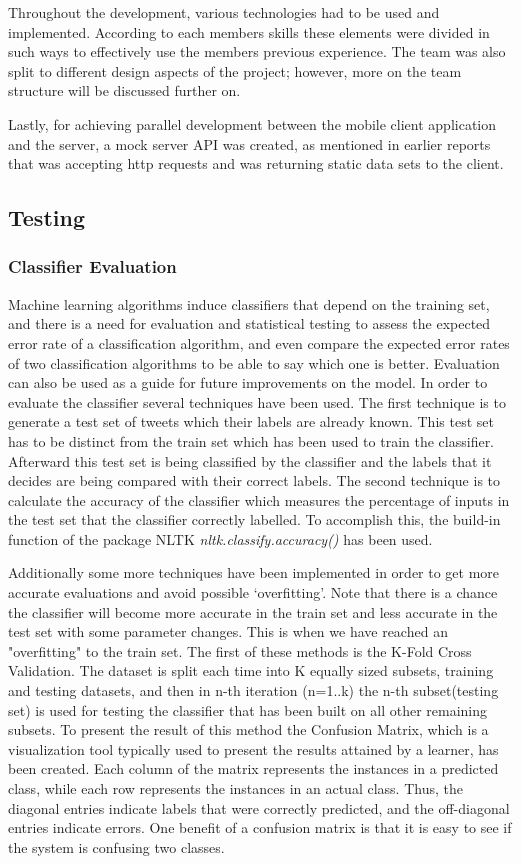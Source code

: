 Throughout the development, various technologies had to be used and implemented. According to each 
members skills these elements were divided in such ways to effectively use the members previous 
experience. The team was also split to different design aspects of the project; however, more on the 
team structure will be discussed further on.

Lastly, for achieving parallel development between 
the mobile client application and the server, a mock server API was created, as mentioned in earlier 
reports that was accepting http requests and was returning static data sets to the client. 

\subsection{Testing} 
\subsubsection{Classifier Evaluation} 
Machine learning algorithms induce classifiers that depend on the training set, and there is a need for evaluation and statistical testing to assess the expected error rate of a classification algorithm, and even compare the expected error rates of two classification algorithms to be able to say which one is better. Evaluation can also be used as a guide for future improvements on the model. In order to evaluate the classifier several techniques have been used. The first technique is to generate a test set of tweets which their labels are already known. This test set has to be distinct from the train set which has been used to train the classifier. Afterward this test set is being classified by the classifier and the labels that it decides are being compared with their correct labels. The second technique is to calculate the accuracy of the classifier which measures the percentage of inputs in the test set that the classifier correctly labelled. To accomplish this, the build-in function of the package NLTK \emph{nltk.classify.accuracy()} has been used.

Additionally some more techniques have been implemented in order to get more
accurate evaluations and avoid possible `overfitting'. Note that there is a chance the classifier will become more accurate in the train set and less accurate in the test set with some parameter changes. This is when we have reached an "overfitting" to the train set. The first of these methods is the K-Fold Cross Validation. The dataset is split each time into K equally sized subsets, training and testing datasets, and then in n-th iteration (n=1..k) the n-th subset(testing set) is used for testing the classifier that has been built on all other remaining subsets. To present the result of this method the Confusion Matrix, which is a visualization tool typically used to present the results attained by a learner, has been created. Each column of the matrix represents the instances in a predicted class, while each row represents the instances in an actual class. Thus, the diagonal entries indicate labels that were correctly predicted, and the off-diagonal entries indicate errors. One benefit of a confusion matrix is that it is easy to see if the system is confusing two classes.

